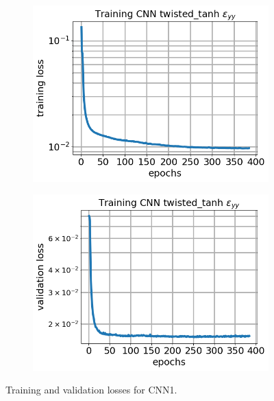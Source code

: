 \documentclass[12pt]{article}
\newcommand{\nhghalfwidth}{0.48\linewidth}
\newcommand{\nhgtotalheight}{4cm}
\begin{document}
\begin{figure}[!h]
  \centering
  \begin{subfigure}[c]{\nhghalfwidth}
    \centering
    \includegraphics[totalheight=\nhgtotalheight]{Figures/Results1/loss.png}
  \end{subfigure}
%  
  \begin{subfigure}[c]{\nhghalfwidth}
    \centering    
    \includegraphics[totalheight=\nhgtotalheight]{Figures/Results1/val_loss.png}
  \end{subfigure}
  \caption{\label{fig:cnn1losses} Training and validation losses for CNN1.}
\end{figure}
%
\end{document}
